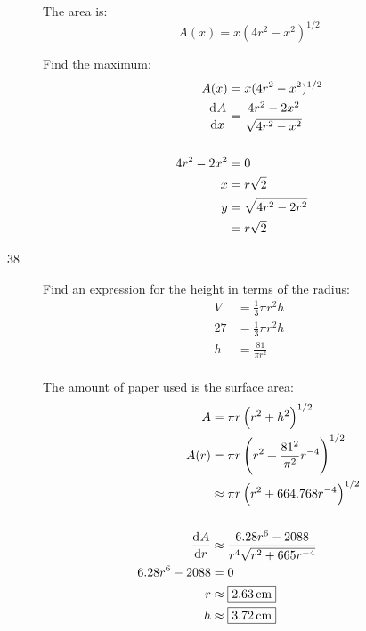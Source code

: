 \documentclass[letterpaper, landscape]{exam}
\begin{document}
\begin{description}
      The area is:
      \[
        A(x) = x (4r^2 - x^2)^{1/2}
      \]

      Find the maximum:
      \begin{align*}
        A(x)        & = x (4r^2 - x^2)^{1/2} \\
        \dod{A}{x}  & = \frac{4r^2 - 2x^2}{\sqrt{4r^2 - x^2}} \\
        \\
        4r^2 - 2x^2 & = 0 \\
        x           & = r \sqrt{2} \\
        y           & = \sqrt{4r^2 - 2r^2} \\
                    & = r \sqrt{2} \\
      \end{align*}


    \newpage

    \item[38]
      Find an expression for the height in terms of the radius:
      \begin{align*}
        V  & = \frac{1}{3} \pi r^2 h \\
        27 & = \frac{1}{3} \pi r^2 h \\
        h  & = \frac{81}{\pi r^2} \\
      \end{align*}

      The amount of paper used is the surface area:
      \begin{align*}
        A              & = \pi r \del{ r^2 + h^2 }^{1/2} \\
        A(r)           & = \pi r \del{ r^2 + \frac{81^2}{\pi^2} r^{-4} }^{1/2} \\
                       & \approx \pi r \del{ r^2 + 664.768 r^{-4} }^{1/2} \\
        \\
        \dod{A}{r}     & \approx \frac{6.28 r^6 - 2088}{r^4 \sqrt{r^2 + 665 r^{-4}}} \\
        6.28r^6 - 2088 & = 0 \\
        r              & \approx \boxed{ \unit[2.63]{cm} } \\
        h              & \approx \boxed{ \unit[3.72]{cm} } \\
      \end{align*}

  \end{description}
\end{document}
